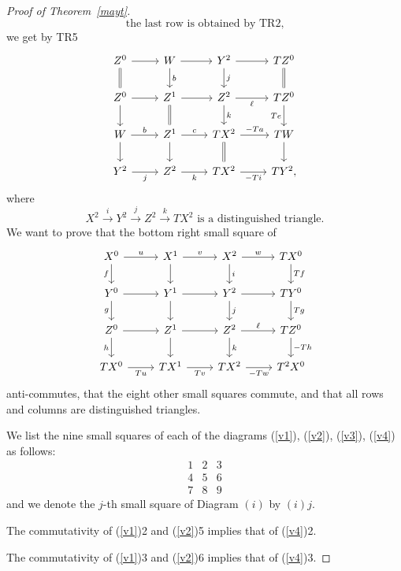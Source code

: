 \documentclass[12pt]{article}
\theoremstyle{remark}
\theoremstyle{definition}
\newcommand{\xr}{\xrightarrow}
\begin{document}
\begin{proof}[Proof of Theorem~\ref{mayt}]
%
\begin{equation}\label{r3}
\text{the last row is obtained by TR2,} 
\end{equation}
%
we get by TR5 
%
\begin{equation}\label{v3}
\begin{tikzcd}
Z^0\ar{r}\ar[equal]{d}&W\ar{d}{b}\ar{r}&Y^2\ar{d}{j}\ar{r}&TZ^0\ar[equal]{d}\\
Z^0\ar{d}\ar{r}&Z^1\ar{r}\ar[equal]{d}&Z^2\ar{d}{k}\ar{r}[swap]{\ell}&TZ^0\ar{d}[swap]{Te}\\
W\ar{d}\ar{r}{b}&Z^1\ar{d}\ar{r}{c}&TX^2\ar{r}{-Ta}\ar[equal]{d}&TW\ar{d}\\
Y^2\ar{r}[swap]{j}&Z^2\ar{r}[swap]{k}&TX^2\ar{r}[swap]{-Ti}&TY^2,
\end{tikzcd}
\end{equation}
%
where 
%
\begin{equation}\label{c3}
X^2\xr iY^2\xr jZ^2\xr kTX^2\text{ is a distinguished triangle.} 
\end{equation}
%
We want to prove that the bottom right small square of 
%
\begin{equation}\label{v4}
\begin{tikzcd}
X^0\ar{r}{u}\ar{d}[swap]{f}&X^1\ar{d}\ar{r}{v}&X^2\ar{d}{i}\ar{r}{w}&TX^0\ar{d}{Tf}\\ 
Y^0\ar{r}\ar{d}[swap]{g}&Y^1\ar{d}\ar{r}&Y^2\ar{d}{j}\ar{r}&TY^0\ar{d}{Tg}\\ 
Z^0\ar{r}\ar{d}[swap]{h}&Z^1\ar{d}\ar{r}&Z^2\ar{d}{k}\ar{r}{\ell}&TZ^0\ar{d}{-Th}\\ 
TX^0\ar{r}[swap]{Tu}&TX^1\ar{r}[swap]{Tv}&TX^2\ar{r}[swap]{-Tw}&T^2X^0
\end{tikzcd}
\end{equation}
%
anti-commutes, that the eight other small squares commute, and that all rows and columns are distinguished triangles.

We list the nine small squares of each of the diagrams (\ref{v1}), (\ref{v2}), (\ref{v3}), (\ref{v4}) as follows:
$$
\begin{matrix}1&2&3\\ 4&5&6\\ 7&8&9
\end{matrix}
$$ 
and we denote the $j$-th small square of Diagram $(i)$ by $(i)j$. 

The commutativity of (\ref{v1})2 and (\ref{v2})5 implies that of (\ref{v4})2. 

The commutativity of (\ref{v1})3 and (\ref{v2})6 implies that of (\ref{v4})3.


\end{proof}
\end{document}
